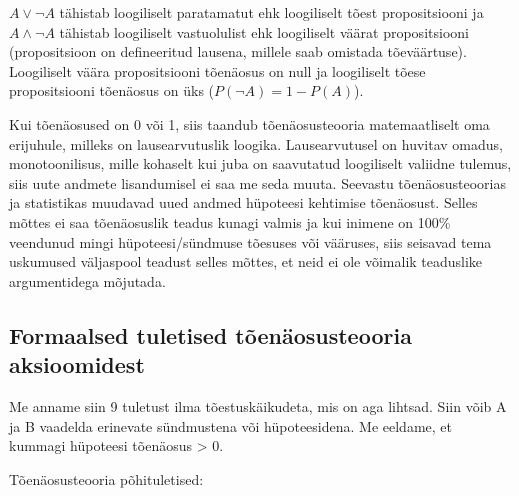 \documentclass[]{book}
\begin{document}
\(A \lor \lnot A\) tähistab loogiliselt paratamatut ehk loogiliselt tõest propositsiooni ja \(A \land \lnot A\) tähistab loogiliselt vastuolulist ehk loogiliselt väärat propositsiooni (propositsioon on defineeritud lausena, millele saab omistada tõeväärtuse). Loogiliselt väära propositsiooni tõenäosus on null ja loogiliselt tõese propositsiooni tõenäosus on üks (\(P(\lnot A) = 1 - P(A)\)).

Kui tõenäosused on 0 või 1, siis taandub tõenäosusteooria matemaatliselt oma erijuhule, milleks on lausearvutuslik loogika. Lausearvutusel on huvitav omadus, monotoonilisus, mille kohaselt kui juba on saavutatud loogiliselt valiidne tulemus, siis uute andmete lisandumisel ei saa me seda muuta. Seevastu tõenäosusteoorias ja statistikas muudavad uued andmed hüpoteesi kehtimise tõenäosust. Selles mõttes ei saa tõenäosuslik teadus kunagi valmis ja kui inimene on 100\% veendunud mingi hüpoteesi/sündmuse tõesuses või vääruses, siis seisavad tema uskumused väljaspool teadust selles mõttes, et neid ei ole võimalik teaduslike argumentidega mõjutada.

\hypertarget{formaalsed-tuletised-toenaosusteooria-aksioomidest}{%
\subsection*{Formaalsed tuletised tõenäosusteooria aksioomidest}\label{formaalsed-tuletised-toenaosusteooria-aksioomidest}}

Me anname siin 9 tuletust ilma tõestuskäikudeta, mis on aga lihtsad. Siin võib A ja B vaadelda erinevate sündmustena või hüpoteesidena. Me eeldame, et kummagi hüpoteesi tõenäosus \textgreater{} 0.

Tõenäosusteooria põhituletised:
\end{document}
